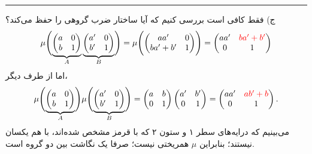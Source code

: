 \documentclass[a4paper, 12pt]{article}
\begin{document}
\par\noindent\rule{\textwidth}{0.6pt}
ج)
فقط کافی است بررسی کنیم که آیا ساختار ضرب گروهی را حفظ می‌کند؟
\begin{equation*}
	\begin{aligned}
		\mu\Biggl(
		\underbrace{\begin{pmatrix}
			a & 0 \\ b & 1
		\end{pmatrix}}_{A}
		\underbrace{\begin{pmatrix}
			a' & 0 \\ b' & 1
		\end{pmatrix}}_{B}
		\Biggr) = \mu\Biggl(
		\begin{pmatrix}
			aa' & 0 \\ ba'+b' & 1
		\end{pmatrix}
		\Biggr)
		 = 
		 \begin{pmatrix}
		 	aa' &{\color{red} ba'+b'} \\ 0 & 1
		 \end{pmatrix}
	\end{aligned}
\end{equation*}
اما از طرف دیگر،
\begin{equation*}
	\begin{aligned}
		\mu\Biggl(
		\underbrace{\begin{pmatrix}
				a & 0 \\ b & 1
		\end{pmatrix}}_{A}
	\Biggr)\mu\Biggl(
		\underbrace{\begin{pmatrix}
				a' & 0 \\ b' & 1
		\end{pmatrix}}_{B}
		\Biggr)  = \begin{pmatrix}
			a & b \\ 0 & 1
		\end{pmatrix}
		 \begin{pmatrix}
			a' & b' \\ 0 & 1
		\end{pmatrix} = 
		 \begin{pmatrix}
			aa' & {\color{red}ab'+b} \\ 0 & 1
		\end{pmatrix}.
	\end{aligned}
\end{equation*}
می‌بینیم که درایه‌های سطر ۱ و ستون ۲ که با 
{\color{red} قرمز}
 مشخص شده‌اند، با هم یکسان نیستند؛ بنابراین $\mu$ همریختی نیست؛ صرفا یک نگاشت بین دو گروه است.
\end{document}

